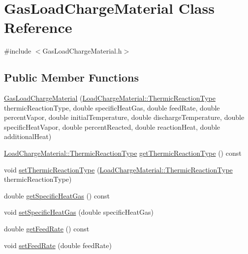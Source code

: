\hypertarget{class_gas_load_charge_material}{}\section{Gas\+Load\+Charge\+Material Class Reference}
\label{class_gas_load_charge_material}


{\ttfamily \#include $<$Gas\+Load\+Charge\+Material.\+h$>$}

\subsection*{Public Member Functions}
\begin{DoxyCompactItemize}
\item 
\hyperlink{class_gas_load_charge_material_aec7d944af0d8b649d8f971240f52d995}{Gas\+Load\+Charge\+Material} (\hyperlink{class_load_charge_material_a51d4263e865a5d86236622dd3fe23fd1}{Load\+Charge\+Material\+::\+Thermic\+Reaction\+Type} thermic\+Reaction\+Type, double specific\+Heat\+Gas, double feed\+Rate, double percent\+Vapor, double initial\+Temperature, double discharge\+Temperature, double specific\+Heat\+Vapor, double percent\+Reacted, double reaction\+Heat, double additional\+Heat)
\item 
\hyperlink{class_load_charge_material_a51d4263e865a5d86236622dd3fe23fd1}{Load\+Charge\+Material\+::\+Thermic\+Reaction\+Type} \hyperlink{class_gas_load_charge_material_ac801f30ccf58ce98fdb6b8cdb0a9767f}{get\+Thermic\+Reaction\+Type} () const
\item 
void \hyperlink{class_gas_load_charge_material_ac48eb07a3008f1dc0ff433353b59536d}{set\+Thermic\+Reaction\+Type} (\hyperlink{class_load_charge_material_a51d4263e865a5d86236622dd3fe23fd1}{Load\+Charge\+Material\+::\+Thermic\+Reaction\+Type} thermic\+Reaction\+Type)
\item 
double \hyperlink{class_gas_load_charge_material_a66e956e7a52b1032a3e8a725f26fa580}{get\+Specific\+Heat\+Gas} () const
\item 
void \hyperlink{class_gas_load_charge_material_a07bf6d4ee9161683fbeb3baad16ea7be}{set\+Specific\+Heat\+Gas} (double specific\+Heat\+Gas)
\item 
double \hyperlink{class_gas_load_charge_material_ae14ebe9b7091a491166174968505b6ee}{get\+Feed\+Rate} () const
\item 
void \hyperlink{class_gas_load_charge_material_a922b728dfd109d1c1684d7dfad82ec8e}{set\+Feed\+Rate} (double feed\+Rate)
\item 

\end{DoxyCompactItemize}
